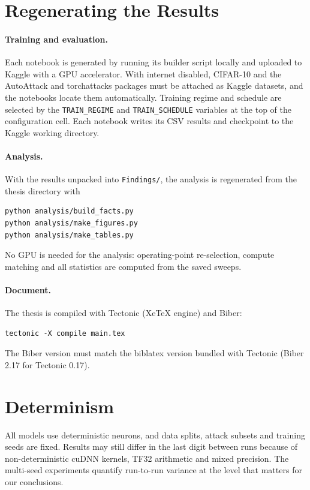 \section{Regenerating the Results}

\paragraph{Training and evaluation.} Each notebook is generated by running its builder script locally and uploaded to Kaggle with a GPU accelerator. With internet disabled, CIFAR-10 and the AutoAttack and torchattacks packages must be attached as Kaggle datasets, and the notebooks locate them automatically. Training regime and schedule are selected by the \texttt{TRAIN\_REGIME} and \texttt{TRAIN\_SCHEDULE} variables at the top of the configuration cell. Each notebook writes its CSV results and checkpoint to the Kaggle working directory.

\paragraph{Analysis.} With the results unpacked into \texttt{Findings/}, the analysis is regenerated from the thesis directory with
\begin{lstlisting}[basicstyle=\ttfamily\small, columns=fullflexible]
python analysis/build_facts.py
python analysis/make_figures.py
python analysis/make_tables.py
\end{lstlisting}
No GPU is needed for the analysis: operating-point re-selection, compute matching and all statistics are computed from the saved sweeps.

\paragraph{Document.} The thesis is compiled with Tectonic (XeTeX engine) and Biber:
\begin{lstlisting}[basicstyle=\ttfamily\small, columns=fullflexible]
tectonic -X compile main.tex
\end{lstlisting}
The Biber version must match the biblatex version bundled with Tectonic (Biber 2.17 for Tectonic 0.17).

\section{Determinism}

All models use deterministic neurons, and data splits, attack subsets and training seeds are fixed. Results may still differ in the last digit between runs because of non-deterministic cuDNN kernels, TF32 arithmetic and mixed precision. The multi-seed experiments quantify run-to-run variance at the level that matters for our conclusions.

